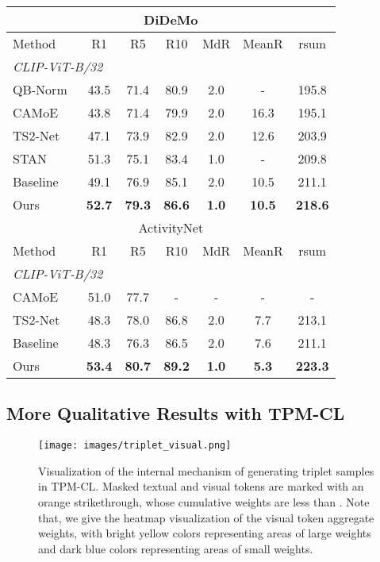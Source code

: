 \documentclass[sigconf]{acmart}
\begin{document}
\begin{table}[]
\begin{tabular}{l| c c c c c c}
         \multicolumn{7}{c}{DiDeMo}  \\
         \midrule
          {Method} & {R1} & {R5} & {R10} & {MdR} & 
         {MeanR} & {rsum} \\ \midrule    
         \multicolumn{7}{l}{\textit{CLIP-ViT-B/32}} \\ 
         {QB-Norm~\cite{querybank2022}} &43.5 &71.4 &80.9 &2.0 &-&195.8\\
         {CAMoE~\cite{camoe2021}} &43.8 &71.4 &79.9 &2.0 &16.3 &195.1\\
         {TS2-Net~\cite{ts2net2022}} & 47.1	&73.9	&82.9	&2.0	&12.6	&203.9 \\
{STAN~\cite{liu2023revisiting}} &51.3 &75.1 &83.4 &1.0 &- &209.8\\
         {{Baseline}} & 49.1	&76.9	&85.1	&2.0	&10.5	&211.1 \\{Ours} &\textbf{52.7} &\textbf{79.3} &\textbf{86.6} &\textbf{1.0} &\textbf{10.5} &\textbf{218.6}  \\ \midrule
        
         \multicolumn{7}{c}{ActivityNet}  \\
         \midrule
          {Method} & {R1} & {R5} & {R10} & {MdR} & 
         {MeanR} & {rsum} \\ \midrule    
         \multicolumn{7}{l}{\textit{CLIP-ViT-B/32}} \\ 
         {CAMoE~\cite{camoe2021}} &51.0 &77.7 &- &- &- &-\\
         {TS2-Net~\cite{ts2net2022}} & 48.3 	&78.0 	&86.8 	&2.0 	&7.7 	&213.1  \\
        {{Baseline}} & 48.3	&76.3	&86.5	&2.0	&7.6	&211.1 \\{Ours} &\textbf{53.4}& \textbf{80.7}& \textbf{89.2}& \textbf{1.0}& \textbf{5.3}& \textbf{223.3} \\ 
         \bottomrule
    \end{tabular}
\end{table}




\subsection{More Qualitative Results with TPM-CL}

\begin{figure}[b] \centering
\texttt{[image: images/triplet\_visual.png]}
  \caption{Visualization of the internal mechanism of generating triplet samples in TPM-CL. Masked textual and visual tokens are marked with an orange strikethrough, whose cumulative weights  are less than . Note that, we give the heatmap visualization of the visual token aggregate weights, with bright yellow colors representing areas of large weights and dark blue colors representing areas of small weights.}
  \label{fig:examples_TPM-CL}
\end{figure}
\end{document}
